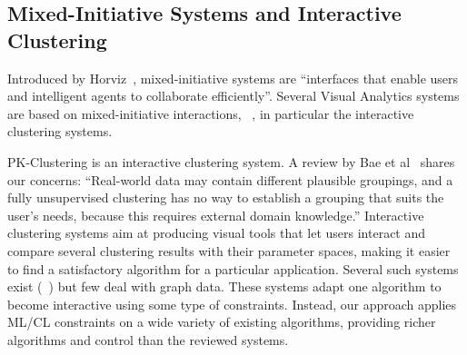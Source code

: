 \subsection{Mixed-Initiative Systems and Interactive Clustering}

Introduced by Horviz~\cite{Horvitz99}, mixed-initiative systems are ``interfaces that enable users and intelligent agents to collaborate efficiently''. Several Visual Analytics systems are based on mixed-initiative interactions, \eg~\cite{makonin16, cook15, zhou13, wall18}, in particular the interactive clustering systems.

PK-Clustering is an interactive clustering system. A review by Bae et al~\cite{baeetal20} shares our concerns:
``Real-world data may contain different plausible groupings, and a fully unsupervised clustering has no way to establish a grouping that suits the user’s needs, because this requires external domain knowledge.''
Interactive clustering systems aim at producing visual tools that let users interact and compare several clustering results with their parameter spaces, making it easier to find a satisfactory algorithm for a particular application. Several such systems exist (\eg~\cite{cavallo2018clustrophile, l2015xclusim}) but few deal with graph data.
These systems adapt one algorithm to become interactive using some type of constraints.
Instead, our approach applies ML/CL constraints on a wide variety of existing algorithms, providing richer algorithms and control than the reviewed systems.


